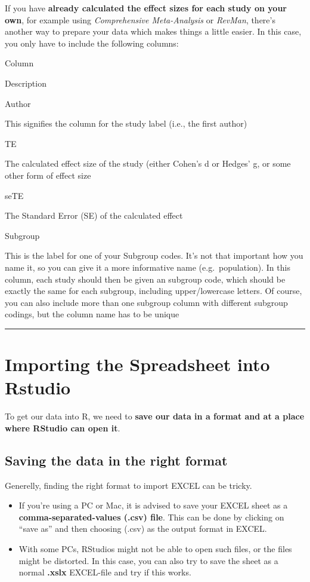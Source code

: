 \documentclass[]{book}
\providecommand{\tightlist}{%
  \setlength{\itemsep}{0pt}\setlength{\parskip}{0pt}}
\begin{document}
If you have \textbf{already calculated the effect sizes for each study on your own}, for example using \emph{Comprehensive Meta-Analysis} or \emph{RevMan}, there's another way to prepare your data which makes things a little easier. In this case, you only have to include the following columns:

Column

Description

Author

This signifies the column for the study label (i.e., the first author)

TE

The calculated effect size of the study (either Cohen's d or Hedges' g, or some other form of effect size

seTE

The Standard Error (SE) of the calculated effect

Subgroup

This is the label for one of your Subgroup codes. It's not that important how you name it, so you can give it a more informative name (e.g.~population). In this column, each study should then be given an subgroup code, which should be exactly the same for each subgroup, including upper/lowercase letters. Of course, you can also include more than one subgroup column with different subgroup codings, but the column name has to be unique

\begin{center}\rule{0.5\linewidth}{\linethickness}\end{center}

\hypertarget{import_excel}{%
\section{Importing the Spreadsheet into Rstudio}\label{import_excel}}

To get our data into R, we need to \textbf{save our data in a format and at a place where RStudio can open it}.

\hypertarget{saving-the-data-in-the-right-format}{%
\subsection{Saving the data in the right format}\label{saving-the-data-in-the-right-format}}

Generelly, finding the right format to import EXCEL can be tricky.

\begin{itemize}
\tightlist
\item
  If you're using a PC or Mac, it is advised to save your EXCEL sheet as a \textbf{comma-separated-values (.csv) file}. This can be done by clicking on ``save as'' and then choosing (.csv) as the output format in EXCEL.
\item
  With some PCs, RStudios might not be able to open such files, or the files might be distorted. In this case, you can also try to save the sheet as a normal \textbf{.xslx} EXCEL-file and try if this works.
\end{itemize}
\end{document}
